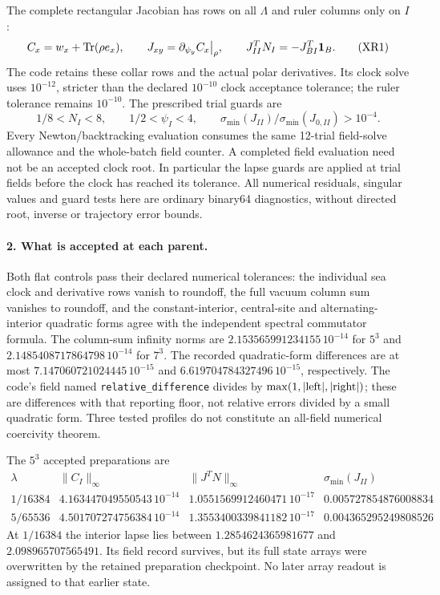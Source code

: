 \documentclass[11pt]{article}
\DeclareMathOperator{\Tr}{Tr}
\begin{document}
The complete rectangular Jacobian has rows on all $\Lambda$ and
ruler columns only on $I$:
\begin{equation}
 C_x=w_x+\Tr(\rho e_x),\qquad
 J_{xy}=\partial_{\psi_y}C_x\big|_\rho,\qquad
 J_{II}^{T}N_I=-J_{BI}^{T}{\bf1}_B .
 \tag{XR1}
\end{equation}
The code retains these collar rows and the actual polar derivatives.
Its clock solve uses $10^{-12}$, stricter than the declared
$10^{-10}$ clock acceptance tolerance; the ruler tolerance remains
$10^{-10}$.  The prescribed trial guards are
\[
 1/8<N_I<8,\qquad 1/2<\psi_I<4,\qquad
 \sigma_{\min}(J_{II})/\sigma_{\min}(J_{0,II})>10^{-4}.
\]
Every Newton/backtracking evaluation consumes the same 12-trial
field-solve allowance and the whole-batch field counter.
A completed field evaluation need not be an accepted clock root.
In particular the lapse guards are applied at trial fields before
the clock has reached its tolerance.
All numerical residuals, singular values and guard tests here are
ordinary binary64 diagnostics, without directed root, inverse or
trajectory error bounds.

\paragraph{2. What is accepted at each parent.}
Both flat controls pass their declared numerical tolerances:
the individual sea clock and derivative rows vanish to roundoff,
the full vacuum column sum vanishes to roundoff, and the
constant-interior, central-site and alternating-interior quadratic
forms agree with the independent spectral commutator formula.
The column-sum infinity norms are
$2.153565991234155\,10^{-14}$ for $5^3$ and
$2.1485408717864798\,10^{-14}$ for $7^3$.
The recorded quadratic-form differences are at most
$7.147060721024445\,10^{-15}$ and
$6.619704784327496\,10^{-15}$, respectively.
The code's field named \texttt{relative\_difference} divides by
$\max(1,|\hbox{left}|,|\hbox{right}|)$; these are differences with
that reporting floor, not relative errors divided by a small
quadratic form.  Three tested profiles do not constitute an
all-field numerical coercivity theorem.

The $5^3$ accepted preparations are
\[
\begin{array}{c|c|c|c}
 \lambda&\|C_I\|_\infty&\|J^TN\|_\infty&
                         \sigma_{\min}(J_{II})\\ \hline
 1/16384&4.163447049550543\,10^{-14}&
          1.0551569912460471\,10^{-17}&0.005727854876008834\\
 5/65536&4.501707274756384\,10^{-14}&
          1.3553400339841182\,10^{-17}&0.004365295249808526
\end{array}
 \tag{XR2}
\]
At $1/16384$ the interior lapse lies between
$1.2854624365981677$ and $2.098965707565491$.
Its field record survives, but its full state arrays were
overwritten by the retained preparation checkpoint.
No later array readout is assigned to that earlier state.
\end{document}
